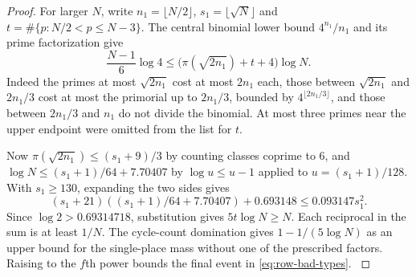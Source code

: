 \begin{proof}
For larger
$N$, write $n_1=\lfloor N/2\rfloor$, $s_1=\lfloor\sqrt N\rfloor$
and $t=\#\{p:N/2<p\le N-3\}$. The central binomial lower
bound $4^{n_1}/n_1$ and its prime factorization give
\[
 \frac{N-1}{6}\log 4 \le
                 \big(\pi(\sqrt{2n_1})+t+4\big)\log N.
\]
Indeed the primes at most $\sqrt{2n_1}$ cost at most $2n_1$
each, those between $\sqrt{2n_1}$ and $2n_1/3$ cost at most
the primorial up to $2n_1/3$, bounded by $4^{\lfloor2n_1/3\rfloor}$,
and those between $2n_1/3$ and $n_1$ do not divide the binomial.
At most three primes near the upper endpoint were omitted from
the list for $t$.

Now $\pi(\sqrt{2n_1})\le(s_1+9)/3$ by counting
classes coprime to $6$, and $\log N\le(s_1+1)/64+7.70407$ by
$\log u\le u-1$ applied to $u=(s_1+1)/128$. With $s_1\ge130$,
expanding the two sides gives
\[
 (s_1+21)((s_1+1)/64+7.70407)+0.693148\le0.093147s_1^2.
\]
Since $\log 2>0.69314718$, substitution gives $5t\log N\ge N$.
Each reciprocal in the sum is at least $1/N$. The cycle-count domination gives
$1-1/(5\log N)$ as an upper bound for the single-place mass
without one of the prescribed factors. Raising to the $f$th
power bounds the final event in \eqref{eq:row-bad-types}.
\label{cor:paired-type-mass-3}
\end{proof}
